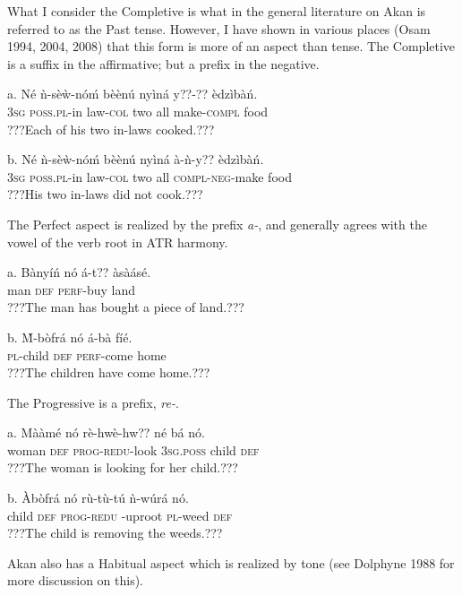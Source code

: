 \documentclass[output=paper]{langsci/langscibook}
\begin{document}
What I consider the Completive is what in the general literature on Akan is referred to as the Past tense. However, I have shown in various places (Osam 1994, 2004, 2008) that this form is more of an aspect than tense. The Completive is a suffix in the affirmative; but a prefix in the negative.  

\ea
\gll \textup{a.}  Né  ǹ-sèẁ-nóḿ    bèènú   nyìná  y??-??    èdzìbàń.\\
     \textsc{ }\textsc{\textup{3sg}}   \textsc{poss.pl}{}-in law-\textsc{col}  two   all  make-\textsc{compl}  food\\
\glt ???Each of his two in-laws cooked.??? \citep[57]{Krampah1970}
\z

\ea
\gll \textup{b.  }Né  ǹ-sèẁ-nóḿ    bèènú   nyìná  à-ǹ-y??      èdzìbàń.\\
     \textsc{  3sg}   \textsc{poss.pl}{}-in law-\textsc{col}  two  all  \textsc{compl-neg}{}-make  food\\
\glt ???His two in-laws did not cook.???
\z

The Perfect aspect is realized by the prefix \emph{a-}, and generally agrees with the vowel of the verb root in ATR harmony.

\ea
\gll \textup{a.}  Bànyíń nó  á-t??     àsàásé.\\
       man  \textsc{def}  \textsc{perf}{}-buy  land\\
\glt ???The man has bought a piece of land.???
\z

\ea
\gll \textup{b.  }\`{M}-bòfrá  nó  á-bà    fíé.\\
     \textsc{  pl}{}-child  \textsc{def}  \textsc{perf}{}-come  home\\
\glt ???The children have come home.???
\z

The Progressive is a prefix, \emph{re-}.

\ea
\gll \textup{a.  }Mààmé   nó  rè-hwè-hw??     né    bá   nó.\\
       woman    \textsc{def}  \textsc{prog-redu}{}-look  \textsc{3sg.poss}  child  \textsc{def}\\
\glt ???The woman is looking for her child.???
\z

\ea
\gll b.  \`{A}bòfrá  nó  r\`{u}-t\`{u}-tú    ǹ-wúrá    nó.\\
       child  \textsc{def}  \textsc{prog-redu} -uproot  \textsc{pl}{}-weed  \textsc{def}\\
\glt ???The child is removing the weeds.???
\z

Akan also has a Habitual aspect which is realized by tone (see Dolphyne 1988 for more discussion on this).
\end{document}
